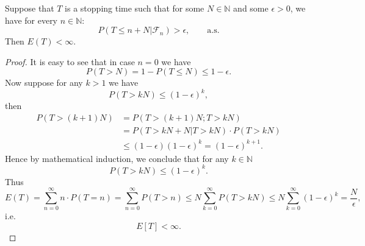\begin{lemma} \label{L:finite_stop}
Suppose that $T$ is a stopping time such that for some $N\in\mathbb{N}$ and
some $\epsilon>0$, we have for every $n\in\mathbb{N}$:
\[
  P(T\le n+N | \mathcal{F}_n) >\epsilon, \qquad \text{a.s.}
\]
Then $E(T)<\infty$.
\end{lemma}
\begin{proof}
It is easy to see that in case $n=0$ we have
\[
  P(T>N)=1-P(T\le N) \le 1-\epsilon.
\]
Now suppose for any $k>1$ we have
\[
  P(T>kN)\le (1-\epsilon)^k,
\]
then
\begin{align*}
  P(T>(k+1)N) 
  &= P(T>(k+1)N ; T>kN) \\
  &= P(T>kN+N | T>kN) \cdot P(T>kN) \\
  &\le (1-\epsilon) (1-\epsilon)^k = (1-\epsilon)^{k+1}.
\end{align*}
Hence by mathematical induction, we conclude that for any $k\in\mathbb{N}$
\[
  P(T>kN)\le (1-\epsilon)^k.
\]
Thus
\[
  E(T) = \sum_{n=0}^{\infty} n\cdot P(T=n)
   = \sum_{n=0}^{\infty} P(T>n)
   \le N \sum_{k=0}^{\infty} P(T>kN)
   \le N \sum_{k=0}^{\infty} (1-\epsilon)^k
   = \frac{N}{\epsilon} ,
\]
i.e.
\[
  E[T]<\infty.
\]
\end{proof}

